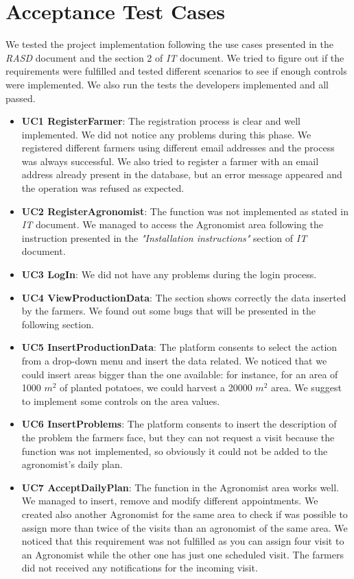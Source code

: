 \section{Acceptance Test Cases}

We tested the project implementation following the use cases presented in the \textit{RASD} document and the section 2 of \textit{IT} document. We tried to figure out if the requirements were fulfilled and tested different scenarios to see if enough controls were implemented. We also run the tests the developers implemented and all passed.

\begin{itemize}
    \item \textbf{UC1 RegisterFarmer}: The registration process is clear and well implemented. We did not notice any problems during this phase. We registered different farmers using different email addresses and the process was always successful. We also tried to register a farmer with an email address already present in the database, but an error message appeared and the operation was refused as expected.
    \item \textbf{UC2 RegisterAgronomist}: The function was not implemented as stated in \textit{IT} document. We managed to access the Agronomist area following the instruction presented in the \textit{"Installation instructions"} section of \textit{IT} document. 
    \item \textbf{UC3 LogIn}: We did not have any problems during the login process. 
    \item \textbf{UC4 ViewProductionData}: The section shows correctly the data inserted by the farmers. We found out some bugs that will be presented in the following section.  
    \item \textbf{UC5 InsertProductionData}: The platform consents to select the action from a drop-down menu and insert the data related. We noticed that we could insert areas bigger than the one available: for instance, for an area of 1000 $m^2$ of planted potatoes, we could harvest a 20000 $m^2$ area. We suggest to implement some controls on the area values. 
    \item \textbf{UC6 InsertProblems}: The platform consents to insert the description of the problem the farmers face, but they can not request a visit because the function was not implemented, so obviously it could not be added to the agronomist's daily  plan.
    \item \textbf{UC7 AcceptDailyPlan}: The function in the Agronomist area works well. We managed to insert, remove and modify different appointments. We created also another Agronomist for the same area to check if was possible to assign more than twice of the visits than an agronomist of the same area. We noticed that this requirement was not fulfilled as you can assign four visit to an Agronomist while the other one has just one scheduled visit. The farmers did not received any notifications for the incoming visit. 

\end{itemize}
